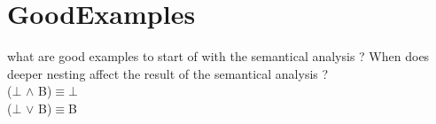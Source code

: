 \section{GoodExamples}
what are good examples to start of with the semantical analysis ? 
 When does deeper nesting affect the result of the semantical analysis ? 
\\($\bot$ $\land$ B)$\equiv$$\bot$\\($\bot$ $\lor$ B)$\equiv$B\\